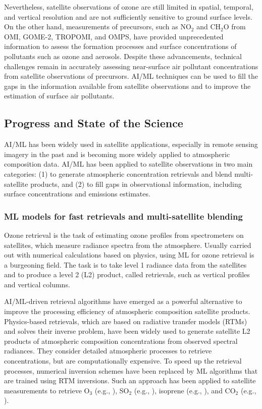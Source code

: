 \documentclass[gmd, manuscript]{copernicus}
\begin{document}
Nevertheless, satellite observations of ozone are still limited in spatial, temporal, and vertical resolution and are not sufficiently sensitive to ground surface levels. On the other hand, measurements of precursors, such as NO$_2$ and CH$_2$O from OMI, GOME-2, TROPOMI, and OMPS, have provided unprecedented information to assess the formation processes and surface concentrations of pollutants such as ozone and aerosols. Despite these advancements, technical challenges remain in accurately assessing near-surface air pollutant concentrations from satellite observations of precursors. AI/ML techniques can be used to fill the gaps in the information available from satellite observations and to improve the estimation of surface air pollutants.

\subsection{Progress and State of the Science}

AI/ML has been widely used in satellite applications, especially in remote sensing imagery \citep{maxwell_implementation_2018} in the past and is becoming more widely applied to atmospheric composition data. AI/ML has been applied to satellite observations in two main categories: (1) to generate atmospheric concentration retrievals and blend multi-satellite products, and (2) to fill gaps in observational information, including surface concentrations and emissions estimates. 

\subsubsection{ML models for fast retrievals and multi-satellite blending}

Ozone retrieval is the task of estimating ozone profiles from spectrometers on satellites, which measure radiance spectra from the atmosphere. Usually carried out with numerical calculations based on physics, using ML for ozone retrieval is a burgeoning field. The task is to take level 1 radiance data from the satellites and to produce a level 2 (L2) product, called retrievals, such as vertical profiles and vertical columns.

AI/ML-driven retrieval algorithms have emerged as a powerful alternative to improve the processing efficiency of atmospheric composition satellite products. Physics-based retrievals, which are based on radiative transfer models (RTMs) and solves their inverse problem, have been widely used to generate satellite L2 products of atmospheric composition concentrations from observed spectral radiances. They consider detailed atmospheric processes to retrieve concentrations, but are computationally expensive. To speed up the retrieval processes, numerical inversion schemes have been replaced by ML algorithms that are trained using RTM inversions. Such an approach has been applied to satellite measurements to retrieve O$_3$ (e.g., \citep{muller_ozone_2003}), SO$_2$ (e.g., \citep{li_new_2022}), isoprene (e.g., \citep{wells_next-generation_2022}), and CO$_2$ (e.g., \citep{xie_fast_2024}). 
\end{document}
